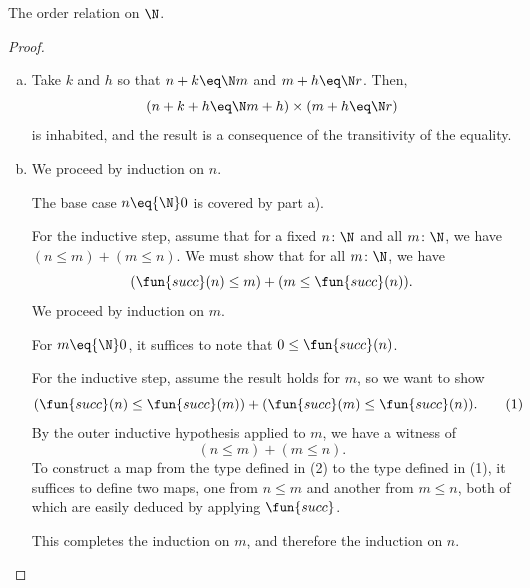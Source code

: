 \begin{lpar}{The order relation on $\N$.}
\begin{proof}
\begin{enumerate}[a)]
            The first theorem follows by induction on $n$. The base case is trivial since $0+s\equiv s$. The inductive step consists in showing a witness of
            \[
                \fun{succ}(n)+s\eq\N\fun{succ}(n)
                    \to\fun{succ}(n+s)\eq\N\fun{succ}(n),
            \]
            which follows from $\fun{succ}(n)\eq\N\fun{succ}(m)\to n\eq\N m$.

            The second theorem follows from induction on $k$. The base case, with $k\equiv0$, is trivial. The inductive step is also trivial because
            \[
                \fun{succ}(k)+h\equiv\fun{succ}(k+h)
            \]
            and so, by Lemma~\ref{lem:succ-ne-0}, there is no inhabitant of $\fun{succ}(k)+h\eq\N0$.

            \item Take $k$ and $h$ so that $n+k\eq\N m$ and $m+h\eq\N r$. Then,
            \[
                (n+k+h\eq\N m+h)\times(m+h\eq\N r)
            \]
            is inhabited, and the result is a consequence of the transitivity of the equality.

            \item We proceed by induction on $n$.

            The base case $n \eq{\N} 0$ is covered by part a).
            
            For the inductive step, assume that for a fixed $n\colon\N$ and all $m\colon\N$, we have $(n \le m) + (m \le n)$. We must show that for all $m\colon\N$, we have
            \[
                (\fun{succ}(n) \le m) + (m \le \fun{succ}(n)).
            \]
            We proceed by induction on $m$.
            
            For $m \eq{\N} 0$, it suffices to note that $0 \le \fun{succ}(n)$.
            
            For the inductive step, assume the result holds for $m$, so we want to show
            \[
                (\fun{succ}(n) \le \fun{succ}(m)) + (\fun{succ}(m) \le \fun{succ}(n)). \tag{1}
            \]
            By the outer inductive hypothesis applied to $m$, we have a witness of
            \[
                (n \le m) + (m \le n). \tag{2}
            \]
            To construct a map from the type defined in (2) to the type defined in (1), it suffices to define two maps, one from $n \le m$ and another from $m \le n$, both of which are easily deduced by applying $\fun{succ}$.
            
            This completes the induction on $m$, and therefore the induction on $n$.


\end{enumerate}
\end{proof}
\end{lpar}
